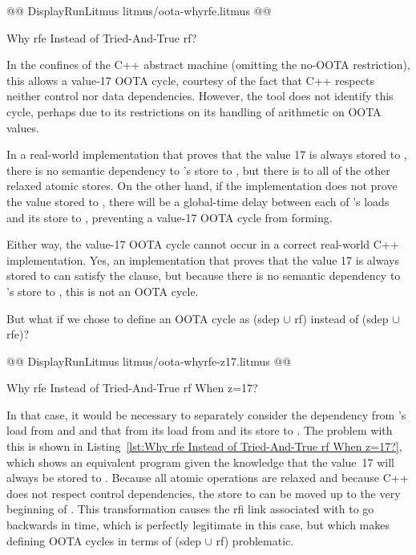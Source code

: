 \documentclass[10]{article}
\begin{document}
\begin{listing}[tbp]
@@ DisplayRunLitmus litmus/oota-whyrfe.litmus @@
\caption{Why rfe Instead of Tried-And-True rf?}
\label{lst:Why rfe Instead of Tried-And-True rf?}
\end{listing}

In the confines of the C++ abstract machine (omitting the no-OOTA
restriction), this allows a value-17 OOTA cycle, courtesy of the fact
that C++ respects neither control nor data dependencies.
However, the  tool does not identify this cycle, perhaps due
to its restrictions on its handling of arithmetic on OOTA values.

In a real-world implementation that proves that the value 17 is always
stored to , there is no semantic dependency to
's store to , but there is to all of the other relaxed
atomic stores.
On the other hand, if the implementation does not prove the value
stored to , there will be a global-time delay between each of
's loads and its store to , preventing a value-17 OOTA
cycle from forming.

Either way, the value-17 OOTA cycle cannot occur in a correct real-world
C++ implementation.
Yes, an implementation that proves that the value 17 is always
stored to  can satisfy the  clause, but because
there is no semantic dependency to 's store to ,
this is not an OOTA cycle.

But what if we chose to define an OOTA cycle as (sdep $\cup$ rf) instead
of (sdep $\cup$ rfe)?

\begin{listing}[tbp]
@@ DisplayRunLitmus litmus/oota-whyrfe-z17.litmus @@
\caption{Why rfe Instead of Tried-And-True rf When z=17?}
\label{lst:Why rfe Instead of Tried-And-True rf When z=17?}
\end{listing}

In that case, it would be necessary to separately consider the dependency
from 's load from  and  and that from its load
from  and its store to .
The problem with this is shown in
Listing~\ref{lst:Why rfe Instead of Tried-And-True rf When z=17?},
which shows an equivalent program given the knowledge that the value~17
will always be stored to .
Because all atomic operations are relaxed and because C++ does not
respect control dependencies, the store to  can be moved up
to the very beginning of .
This transformation causes the rfi link associated with  to
go backwards in time, which is perfectly legitimate in this case,
but which makes defining OOTA cycles in terms of (sdep $\cup$ rf)
problematic.
\end{document}
